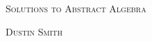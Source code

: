\documentclass[dvipsnames]{scrbook}%
\begin{document}
\frontmatter
\begin{center}
  \begin{center}
  \vspace*{\fill}
  \textsc{\LARGE Solutions to Abstract Algebra}
  \bigskip

  \textsc{\LARGE Dustin Smith}
  \vspace*{\fill}
\end{center}
\end{center}

\tableofcontents

\mainmatter
%
%
\end{document}
